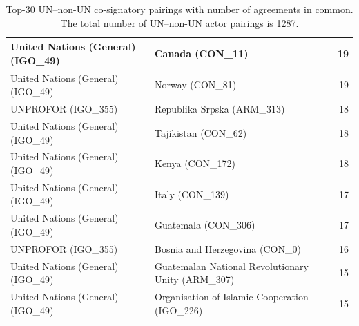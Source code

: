 \documentclass{article}
\begin{document}
\begin{table}[H]
\begin{center}
\begin{tabularx}{\textwidth}{|X|X|r|}
\hline
United Nations (General) (IGO\_49) & Canada (CON\_11) & 19 \\
\hline
United Nations (General) (IGO\_49) & Norway (CON\_81) & 19 \\
\hline
UNPROFOR (IGO\_355) & Republika Srpska (ARM\_313) & 18 \\
\hline
United Nations (General) (IGO\_49) & Tajikistan (CON\_62) & 18 \\
\hline
United Nations (General) (IGO\_49) & Kenya (CON\_172) & 18 \\
\hline
United Nations (General) (IGO\_49) & Italy (CON\_139) & 17 \\
\hline
United Nations (General) (IGO\_49) & Guatemala  (CON\_306) & 17 \\
\hline
UNPROFOR (IGO\_355) & Bosnia and Herzegovina (CON\_0) & 16 \\
\hline
United Nations (General) (IGO\_49) & Guatemalan National Revolutionary Unity (ARM\_307) & 15 \\
\hline
United Nations (General) (IGO\_49) & Organisation of Islamic Cooperation (IGO\_226) & 15 \\
\hline
\end{tabularx}
\end{center}
\normalsize
\caption{Top-30 UN--non-UN co-signatory pairings with number of agreements in common. The total number of UN--non-UN actor pairings is 1287.}
\end{table}

\pagebreak
\end{document}
